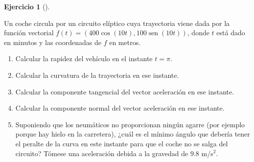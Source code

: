 \documentclass[
  a4paper,
]{scrreport}
\theoremstyle{definition}
\newtheorem{exercise}{Ejercicio}[chapter]
\theoremstyle{remark}
\begin{document}
\begin{exercise}[]\protect\hypertarget{exr-2}{}\label{exr-2}

Un coche circula por un circuito elíptico cuya trayectoria viene dada
por la función vectorial
\(f(t)=(400\cos(10t), 100\operatorname{sen}(10t))\), donde \(t\) está
dado en minutos y las coordenadas de \(f\) en metros.

\begin{enumerate}
\def\labelenumi{\alph{enumi}.}
\item
  Calcular la rapidez del vehículo en el instante \(t=\pi\).
\item
  Calcular la curvatura de la trayectoria en ese instante.
\item
  Calcular la componente tangencial del vector aceleración en ese
  instante.
\item
  Calcular la componente normal del vector aceleración en ese instante.
\item
  Suponiendo que los neumáticos no proporcionan ningún agarre (por
  ejemplo porque hay hielo en la carretera), ¿cuál es el mínimo ángulo
  que debería tener el peralte de la curva en este instante para que el
  coche no se salga del circuito? Tómese una aceleración debida a la
  gravedad de \(9.8\) m/s\(^2\).
\end{enumerate}

\end{exercise}
\end{document}

